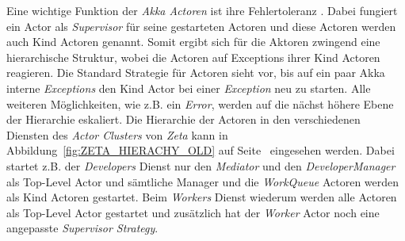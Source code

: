 \begin{sloppypar}
Eine wichtige Funktion der \textit{Akka Actoren} ist ihre Fehlertoleranz \cite{akka_fault_tolerance}. Dabei fungiert ein Actor als \textit{Supervisor} für seine gestarteten Actoren und diese Actoren werden auch Kind Actoren genannt. Somit ergibt sich für die Aktoren zwingend eine hierarchische Struktur, wobei die Actoren auf Exceptions ihrer Kind Actoren reagieren. Die Standard Strategie für Actoren sieht vor, bis auf ein paar Akka interne \textit{Exceptions} den Kind Actor bei einer \textit{Exception} neu zu starten. Alle weiteren Möglichkeiten, wie z.B. ein \textit{Error}, werden auf die nächst höhere Ebene der Hierarchie eskaliert. Die Hierarchie der Actoren in den verschiedenen Diensten des \textit{Actor Clusters} von \textit{Zeta} kann in Abbildung~\ref{fig:ZETA_HIERACHY_OLD} auf Seite~\pageref{fig:ZETA_HIERACHY_OLD} eingesehen werden. Dabei startet z.B. der \textit{Developers} Dienst nur den \textit{Mediator} und den \textit{DeveloperManager} als Top-Level Actor und sämtliche Manager und die \textit{WorkQueue} Actoren werden als Kind Actoren gestartet. Beim \textit{Workers} Dienst wiederum werden alle Actoren als Top-Level Actor gestartet und zusätzlich hat der \textit{Worker} Actor noch eine angepasste \textit{Supervisor Strategy}.
\end{sloppypar}


